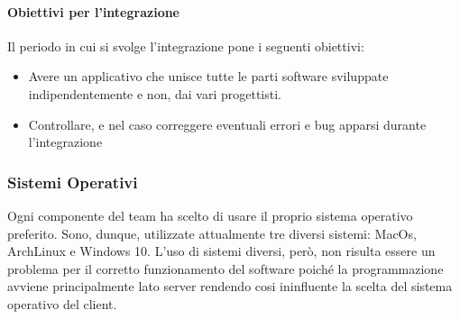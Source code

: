 \paragraph{Obiettivi per l'integrazione}
Il periodo in cui si svolge l'integrazione pone i seguenti obiettivi:
\begin{itemize}
\item Avere un applicativo che unisce tutte le parti software sviluppate indipendentemente e non, dai vari progettisti.
\item Controllare, e nel caso correggere eventuali errori e bug apparsi durante l'integrazione
\end{itemize}

\subsubsection{Sistemi Operativi}
Ogni componente del team ha scelto di usare il proprio sistema operativo preferito. Sono, dunque, utilizzate attualmente tre diversi sistemi: MacOs,  ArchLinux e Windows 10. L'uso di sistemi diversi, però, non risulta essere un problema per il corretto funzionamento del software poiché la programmazione avviene principalmente lato server rendendo cosi ininfluente la scelta del sistema operativo del client.

\newpage 
